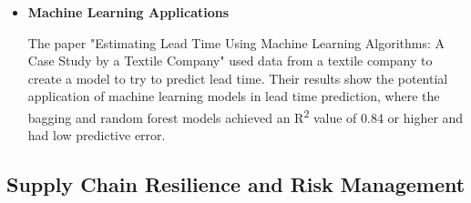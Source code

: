 \documentclass[12pt]{report}
\begin{document}
\begin{itemize}
  \item \textbf{Machine Learning Applications}
  
  The paper "Estimating Lead Time Using Machine Learning Algorithms: A Case Study by a Textile Company" \cite{MachineLearningLeadtime} used data from a textile company to create a model to try to predict lead time. Their results show the potential application of machine learning models in lead time prediction, where the bagging and random forest models achieved an R\textsuperscript{2} value of 0.84 or higher and had low predictive error.
\end{itemize}

\subsection{Supply Chain Resilience and Risk Management}
\end{document}
